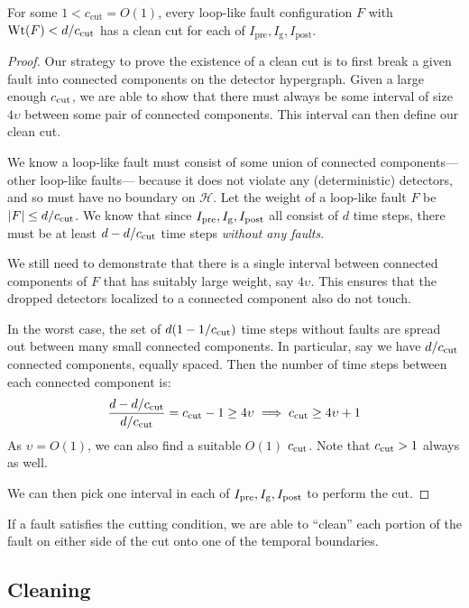 \documentclass[11pt]{article}
\begin{document}
\begin{lemma}
\label{lem:cutting-condition-existence}
For some $1 < c_\mathrm{cut}=O(1)$, every loop-like fault configuration $F$ with $\operatorname{Wt}(F)<d/c_\mathrm{cut}$ has a clean cut for each of $I_\mathrm{pre}, I_\mathrm{g}, I_\mathrm{post}$.
\end{lemma}
\begin{proof}
Our strategy to prove the existence of a clean cut is to first break a given fault into connected components on the detector hypergraph. Given a large enough $c_{\rm cut}$, we are able to show that there must always be some interval of size $4 \upsilon$ between some pair of connected components. This interval can then define our clean cut. 

We know a loop-like fault must consist of some union of connected components--- other loop-like faults--- because it does not violate any (deterministic) detectors, and so must have no boundary on $\mathcal{H}$. Let the weight of a loop-like fault $F$ be $|F| \leq d/c_{\rm cut}$. We know that since $I_{\rm pre}, I_{\rm g}, I_{\rm post}$ all consist of $d$ time steps, there must be at least $d - d/c_{\rm cut}$ time steps \emph{without any faults}. 

We still need to demonstrate that there is a single interval between connected components of $F$ that has suitably large weight, say $4 \upsilon$. This ensures that the dropped detectors localized to a connected component also do not touch. 

In the worst case, the set of $d( 1- 1/c_{\rm cut})$ time steps without faults are spread out between many small connected components. In particular, say we have $d/c_{\rm cut}$ connected components, equally spaced. Then the number of time steps between each connected component is:
\[
\frac{d - d/c_{\rm cut}}{d/c_{\rm cut}} = c_{\rm cut} - 1 \geq 4 \upsilon \implies c_{\rm cut} \geq 4\upsilon + 1
\]
As $\upsilon = O(1)$, we can also find a suitable $O(1)$ $c_{\rm cut}$. Note that $c_{\rm cut} > 1$ always as well. 

We can then pick one interval in each of $I_{\rm pre}, I_{\rm g}, I_{\rm post}$ to perform the cut.

\end{proof}

If a fault satisfies the cutting condition, we are able to ``clean'' each portion of the fault on either side of the cut onto one of the temporal boundaries. 

\subsection{Cleaning} \label{sec:cleaning}
\end{document}
